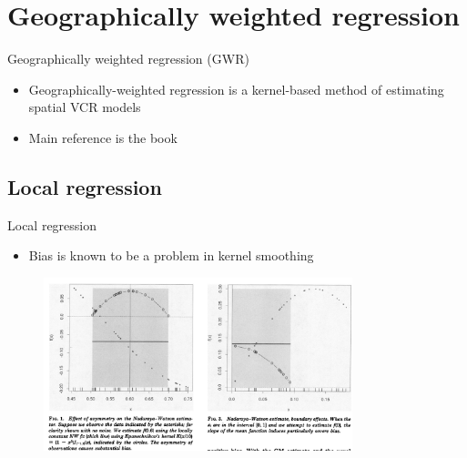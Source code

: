 \documentclass{beamer}
\begin{document}
    \section{Geographically weighted regression}
    \begin{frame}{Geographically weighted regression (GWR)}
        \begin{itemize}
            \item Geographically-weighted regression \citep{Brundson:1998} is a kernel-based method of estimating spatial VCR models
            \item Main reference is the book \cite{Fotheringham:2002}     
        \end{itemize}
    \end{frame}
    


    \subsection{Local regression}
    \begin{frame}{Local regression}
        \begin{itemize}
            \item Bias is known to be a problem in kernel smoothing \citep{Hastie:1993b}
        \end{itemize}

        \begin{figure}
        \begin{center}
	  \includegraphics[width=0.8\textwidth]{../../figures/scratch/kernelbias}
        \end{center}
        \end{figure}
    \end{frame}
    
\end{document}
